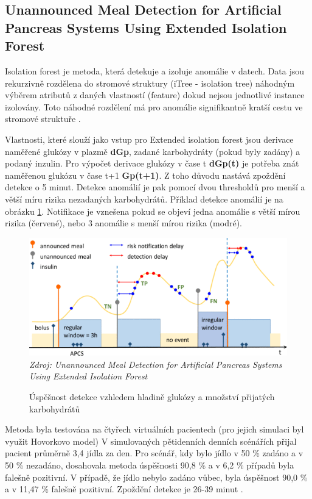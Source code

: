 \subsection{Unannounced Meal Detection for Artificial Pancreas Systems Using Extended Isolation Forest}
\label{ch:analyzaCHO:forest}

Isolation forest je metoda, která detekuje a izoluje anomálie v datech. Data jsou rekurzivně rozdělena do stromové struktury (iTree - isolation tree) náhodným výběrem atributů z daných vlastností (feature) dokud nejsou jednotlivé instance izolovány. Toto náhodné rozdělení má pro anomálie signifikantně kratší cestu ve stromové struktuře \citep{analyzaCHO.IsolationForest}.

Vlastnosti, které slouží jako vstup pro Extended isolation forest \citep{analyzaCHO.ExtendedIsolationForest} jsou derivace naměřené glukózy v plazmě \textbf{dGp}, zadané karbohydráty (pokud byly zadány) a podaný inzulin. Pro výpočet derivace glukózy v čase t \textbf{dGp(t)} je potřeba znát naměřenou glukózu v čase t+1 \textbf{Gp(t+1)}. Z toho důvodu nastává zpoždění detekce o 5 minut. Detekce anomálií je pak pomocí dvou thresholdů pro menší a větší míru rizika nezadaných karbohydrátů.
Příklad detekce anomálií je na obrázku \ref{fig:analyza:forest}. Notifikace je vznešena pokud se objeví jedna anomálie s větší mírou rizika (červené), nebo 3 anomálie s menší mírou rizika (modré).

\begin{figure}[H]
\caption{Úspěšnost detekce vzhledem hladině glukózy a množství přijatých karbohydrátů}
\label{fig:analyza:forest}
\includegraphics[width=1\textwidth]{img/analyzaCHO/forest.png}\\
\textit{Zdroj: Unannounced Meal Detection for Artificial Pancreas Systems Using Extended Isolation Forest \citep{analyzaCHO.ExtendedIsolationForest}}
\end{figure}

Metoda byla testována na čtyřech virtuálních pacientech (pro jejich simulaci byl využit Hovorkovo model) V simulovaných pětidenních denních scénářích přijal pacient průměrně 3,4 jídla za den. Pro scénář, kdy bylo jídlo v 50 \% zadáno a v 50 \% nezadáno, dosahovala metoda úspěšnosti 90,8 \% a v 6,2 \% případů byla falešně pozitivní. V případě, že jídlo nebylo zadáno vůbec, byla úspěšnost 90,0 \% a v 11,47 \% falešně pozitivní. Zpoždění detekce je 26-39 minut \citep{analyzaCHO.ExtendedIsolationForest}.


